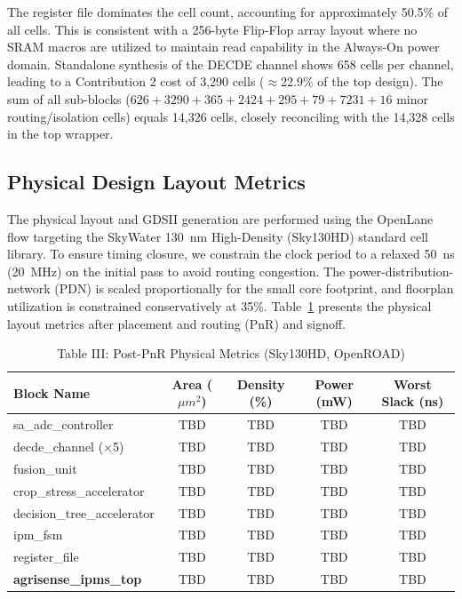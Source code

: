 \documentclass[conference]{IEEEtran}
\begin{document}
The register file dominates the cell count, accounting for approximately 50.5\% of all cells. This is consistent with a 256-byte Flip-Flop array layout where no SRAM macros are utilized to maintain read capability in the Always-On power domain. Standalone synthesis of the DECDE channel shows 658 cells per channel, leading to a Contribution 2 cost of 3,290 cells ($\approx$22.9\% of the top design). The sum of all sub-blocks ($626 + 3290 + 365 + 2424 + 295 + 79 + 7231 + 16$ minor routing/isolation cells) equals 14,326 cells, closely reconciling with the 14,328 cells in the top wrapper.

\subsection{Physical Design Layout Metrics}
The physical layout and GDSII generation are performed using the OpenLane flow targeting the SkyWater 130~nm High-Density (Sky130HD) standard cell library. To ensure timing closure, we constrain the clock period to a relaxed 50~ns (20~MHz) on the initial pass to avoid routing congestion. The power-distribution-network (PDN) is scaled proportionally for the small core footprint, and floorplan utilization is constrained conservatively at 35\%. Table~\ref{tab:post_pnr_metrics} presents the physical layout metrics after placement and routing (PnR) and signoff.

\begin{table}[htbp]
\caption{Table III: Post-PnR Physical Metrics (Sky130HD, OpenROAD)}
\begin{center}
\begin{tabular}{|l|c|c|c|c|}
\hline
\textbf{Block Name} & \textbf{Area ($\mu m^2$)} & \textbf{Density (\%)} & \textbf{Power (mW)} & \textbf{Worst Slack (ns)} \\
\hline
sa\_adc\_controller & TBD & TBD & TBD & TBD \\
decde\_channel ($\times$5) & TBD & TBD & TBD & TBD \\
fusion\_unit & TBD & TBD & TBD & TBD \\
crop\_stress\_accelerator & TBD & TBD & TBD & TBD \\
decision\_tree\_accelerator & TBD & TBD & TBD & TBD \\
ipm\_fsm & TBD & TBD & TBD & TBD \\
register\_file & TBD & TBD & TBD & TBD \\
\hline
\textbf{agrisense\_ipms\_top} & TBD & TBD & TBD & TBD \\
\hline
\end{tabular}
\label{tab:post_pnr_metrics}
\end{center}
\end{table}
\end{document}

